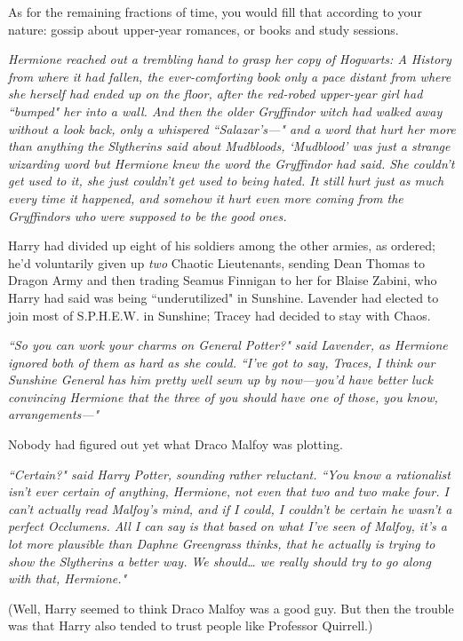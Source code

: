 As for the remaining fractions of time, you would fill that according to your nature: gossip about upper-year romances, or books and study sessions.

\emph{Hermione reached out a trembling hand to grasp her copy of \emph{Hogwarts: A History} from where it had fallen, the ever-comforting book only a pace distant from where she herself had ended up on the floor, after the red-robed upper-year girl had ``bumped" her into a wall. And then the older Gryffindor witch had walked away without a look back, only a whispered \mbox{``Salazar's—"} and a word that hurt her more than anything the Slytherins said about Mudbloods, `Mudblood' was just a strange wizarding word but Hermione knew the word the Gryffindor had said. She couldn't get used to it, she just couldn't get used to being hated. It still hurt just as much every time it happened, and somehow it hurt even more coming from the Gryffindors who were \emph{supposed} to be the good ones.}

Harry had divided up eight of his soldiers among the other armies, as ordered; he'd voluntarily given up \emph{two} Chaotic Lieutenants, sending Dean Thomas to Dragon Army and then trading Seamus Finnigan to her for Blaise Zabini, who Harry had said was being ``underutilized" in Sunshine. Lavender had elected to join most of S.P.H.E.W. in Sunshine; Tracey had decided to stay with Chaos.

\emph{``So you can work your charms on General Potter?" said Lavender, as Hermione ignored both of them as hard as she could. ``I've got to say, Traces, I think our Sunshine General has him pretty well sewn up by now—you'd have better luck convincing Hermione that the three of you should have one of those, you know, arrangements—"}

Nobody had figured out yet what Draco Malfoy was plotting.

\emph{``Certain?" said Harry Potter, sounding rather reluctant. ``You know a rationalist isn't ever certain of anything, Hermione, not even that two and two make four. I can't actually read Malfoy's mind, and if I could, I couldn't be certain he wasn't a perfect Occlumens. All I can say is that based on what I've seen of Malfoy, it's a lot more plausible than Daphne Greengrass thinks, that he actually is trying to show the Slytherins a better way. We should{\ldots} we really should try to go along with that, Hermione."}

(Well, Harry seemed to think Draco Malfoy was a good guy. But then the trouble was that Harry also tended to trust people like Professor Quirrell.)

